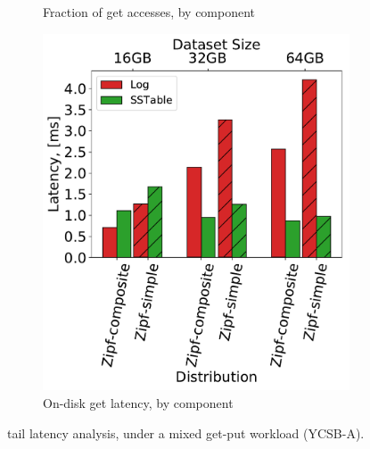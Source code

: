 {\begin{figure}[tb]
\begin{subfigure}{0.32\linewidth}
\caption{Fraction of get accesses, by component}
\label{fig:tail_latency:dist}
\end{subfigure}
\begin{subfigure}{0.31\linewidth}
\includegraphics[width=\textwidth]{figs/Latency_A.pdf}
\caption{On-disk get latency, by component}
\label{fig:tail_latency:disk}
\end{subfigure}
\label{fig:tail_latency}
\caption{{\sys\/ tail latency analysis, under a mixed get-put workload (YCSB-A).}}
\end{figure}
}

